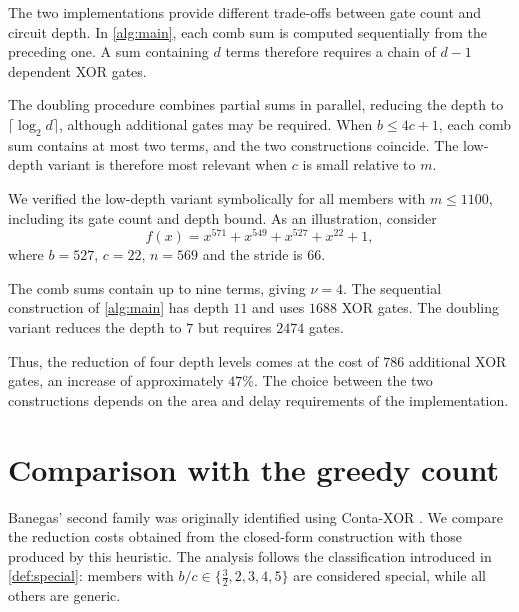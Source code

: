 \documentclass{ieeeaccess}
\theoremstyle{plain}
\theoremstyle{definition}
\begin{document}
The two implementations provide different trade-offs between gate count and
circuit depth. In \cref{alg:main}, each comb sum is computed sequentially from
the preceding one. A sum containing $d$ terms therefore requires a chain of
$d-1$ dependent XOR gates.

The doubling procedure combines partial sums in parallel, reducing the depth to
$\lceil\log_2d\rceil$, although additional gates may be required. When
$b\le4c+1$, each comb sum contains at most two terms, and the two constructions
coincide. The low-depth variant is therefore most relevant when $c$ is small
relative to $m$.

We verified the low-depth variant symbolically for all members with $m\le1100$,
including its gate count and depth bound. As
an illustration, consider
\[
  f(x)=x^{571}+x^{549}
    +x^{527}+x^{22}+1,
\]
where $b=527$, $c=22$, $n=569$ and the stride is $66$.

The comb sums contain up to nine terms, giving $\nu=4$. The sequential
construction of \cref{alg:main} has depth $11$ and uses $1688$ XOR gates. The
doubling variant reduces the depth to $7$ but requires $2474$ gates.

Thus, the reduction of four depth levels comes at the cost of $786$ additional
XOR gates, an increase of approximately $47\%$. The choice between the two
constructions depends on the area and delay requirements of the implementation.


\section{Comparison with the greedy count}\label{sec:greedy}

Banegas' second family was originally identified using Conta-XOR
\cite{Banegas2015}. We compare the reduction costs obtained from the closed-form
construction with those produced by this heuristic. The analysis follows the
classification introduced in \cref{def:special}: members with
$b/c\in\{\tfrac32,2,3,4,5\}$ are considered special, while all others are
generic.
\end{document}

